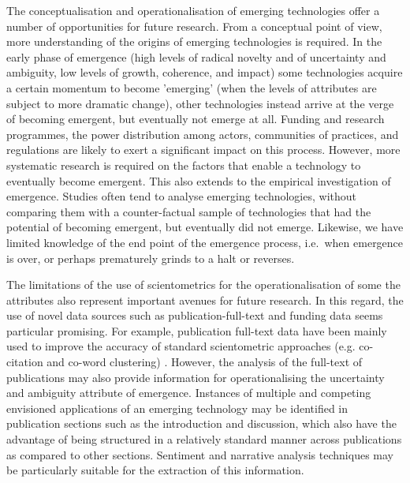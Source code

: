 \documentclass[11pt]{article}
\begin{document}
The conceptualisation and operationalisation of emerging technologies offer a number of opportunities for future research. From a conceptual point of view, more understanding of the origins of emerging technologies is required. In the early phase of emergence (high levels of radical novelty and of uncertainty and ambiguity, low levels of growth, coherence, and impact) some technologies acquire a certain momentum to become 'emerging' (when the levels of attributes are subject to more dramatic change), other technologies instead arrive at the verge of becoming emergent, but eventually not emerge at all. Funding and research programmes, the power distribution among actors, communities of practices, and regulations are likely to exert a significant impact on this process. However, more systematic research is required on the factors that enable a technology to eventually become emergent. This also extends to the empirical investigation of emergence. Studies often tend to analyse emerging technologies, without comparing them with a counter-factual sample of technologies that had the potential of becoming emergent, but eventually did not emerge. Likewise, we have limited knowledge of the end point of the emergence process, i.e.\ when emergence is over, or perhaps prematurely grinds to a halt or reverses. 

The limitations of the use of scientometrics for the operationalisation of some the attributes also represent important avenues for future research. In this regard, the use of novel data sources such as publication-full-text and funding data seems particular promising. For example, publication full-text data have been mainly used to improve the accuracy of standard scientometric approaches (e.g. co-citation and co-word clustering) \citep[e.g.][]{Boyack2013,Glenisson2005}. However, the analysis of the full-text of publications may also provide information for operationalising the uncertainty and ambiguity attribute of emergence. Instances of multiple and competing envisioned applications of an emerging technology may be identified in publication sections such as the introduction and discussion, which also have the advantage of being structured in a relatively standard manner across publications as compared to other sections. Sentiment and narrative analysis techniques may be particularly suitable for the extraction of this information.
\end{document}
